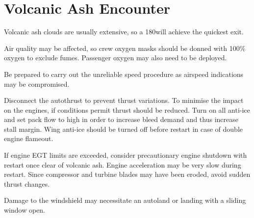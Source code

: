 \documentclass[a5paper,11pt,twoside]{book}
\newcommand{\multicite}[1]{
  \nopagebreak
  \noindent{\footnotesize\color{blue}{[ #1 ]}}
}
\begin{document}
\section{Volcanic Ash Encounter}

Volcanic ash clouds are usually extensive, so a 180\textdegree{ }will achieve
the quickest exit.

Air quality may be affected, so crew oxygen masks should be donned with 100\%
oxygen to exclude fumes. Passenger oxygen may also need to be deployed.

Be prepared to carry out the unreliable speed procedure as airspeed indications
may be compromised.

Disconnect the autothrust to prevent thrust variations. To minimise the impact
on the engines, if conditions permit thrust should be reduced. Turn on all
anti-ice and set pack flow to high in order to increase bleed demand and thus
increase stall margin. Wing anti-ice should be turned off before restart in case
of double engine flameout.

If engine EGT limits are exceeded, consider precautionary engine shutdown with
restart once clear of volcanic ash. Engine acceleration may be very slow during
restart. Since compressor and turbine blades may have been eroded, avoid sudden
thrust changes.

Damage to the windshield may necessitate an autoland or landing with a sliding
window open.

\multicite{QRH~AEP.MISC, FCOM~PRO.AEP.MISC, FCTM~PRO.AEP.MISC}
\end{document}
